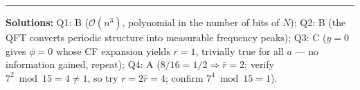\documentclass[a4paper,11pt]{article}
\begin{document}
\vspace{1cm}
\hrule
\vspace{0.2cm}
\footnotesize{\textbf{Solutions:}
Q1: B ($\mathcal{O}(n^3)$, polynomial in the number of bits of $N$);
Q2: B (the QFT converts periodic structure into measurable frequency peaks);
Q3: C ($y=0$ gives $\phi=0$ whose CF expansion yields $r=1$, trivially
    true for all $a$ — no information gained, repeat);
Q4: A ($8/16 = 1/2 \Rightarrow \hat{r}=2$; verify $7^2 \bmod 15 = 4 \neq 1$,
    so try $r = 2\hat{r} = 4$; confirm $7^4 \bmod 15 = 1$).}
\end{document}
